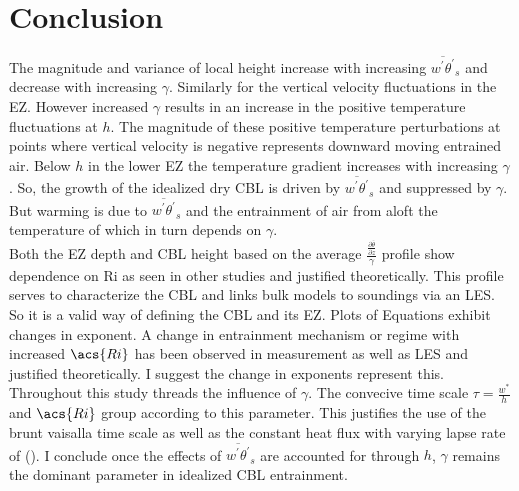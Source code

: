 \section{Conclusion}

The magnitude and variance of local height increase with increasing $\overline{w^{'}\theta^{'}}_{s}$ and decrease with increasing $\gamma$.  Similarly for the vertical velocity fluctuations in the \acs{EZ}.  However increased $\gamma$ results in an increase in the positive temperature fluctuations at $h$. The magnitude of these positive temperature perturbations at points where vertical velocity is negative represents downward moving entrained air.  Below $h$ in the lower \acs{EZ} the temperature gradient increases with increasing $\gamma$. So, the growth of the idealized dry \acs{CBL} is driven by $\overline{w^{'}\theta^{'}}_{s}$ and suppressed by $\gamma$. But warming is due to $\overline{w^{'}\theta^{'}}_{s}$ and the entrainment of air from aloft the temperature of which in turn depends on $\gamma$.\\

Both the \acs{EZ} depth and \acs{CBL} height based on the average $\frac{\frac{\partial \overline{\theta}}{\partial z}}{\gamma}$ profile show dependence on \acs{Ri} as seen in other studies and justified theoretically.  This profile serves to characterize the \acs{CBL} and links bulk models to soundings via an \acs{LES}.  So it is a valid way of defining the \acs{CBL} and its \acs{EZ}. Plots of Equations exhibit changes in exponent.  A change in entrainment mechanism or regime with increased $\acs{Ri}$ has been observed in measurement as well as \acs{LES} and justified theoretically. I suggest the change in exponents represent this.\\

Throughout this study threads the influence of $\gamma$.  The convecive time scale $\tau = \frac{w^{*}}{h}$ and $\acs{Ri}$ group according to this parameter.  This justifies  the use of the brunt vaisalla time scale as well as the constant heat flux with varying lapse rate of 
\citeauthor{FedConzMir04} (\citeyear{FedConzMir04}).  I conclude once the effects of $\overline{w^{'}\theta^{'}}_{s}$ are accounted for through $h$, $\gamma$ remains the dominant parameter in idealized \acs{CBL} entrainment.\\ 

\FloatBarrier


\endinput

Any text after an \endinput is ignored.
You could put scraps here or things in progress.
